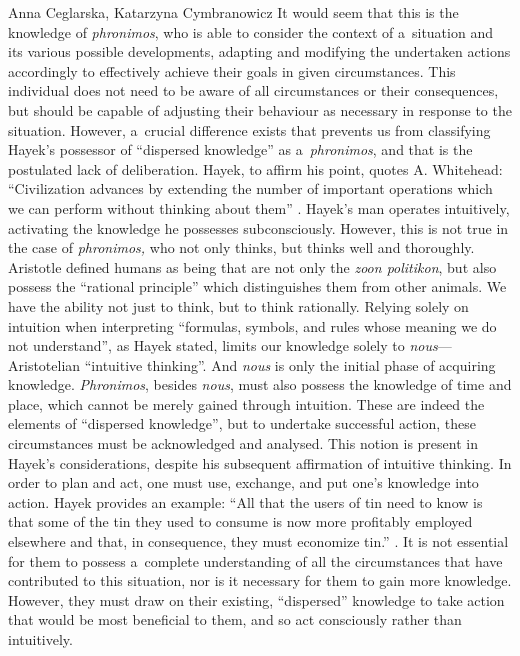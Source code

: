 \begin{artengenv2auth}{Anna Ceglarska, Katarzyna Cymbranowicz}
It would seem that this is the knowledge of \textit{phronimos}, who is able to consider the context of a~situation and its various possible developments, adapting and modifying the undertaken actions accordingly to effectively achieve their goals in given circumstances. This individual does not need to be aware of all circumstances or their consequences, but should be capable of adjusting their behaviour as necessary in response to the situation. However, a~crucial difference exists that prevents us from classifying Hayek's possessor of ``dispersed knowledge'' as a~\textit{phronimos}, and that is the postulated lack of deliberation. Hayek, to affirm his point, quotes A. Whitehead: ``Civilization advances by extending the number of important operations which we can perform without thinking about them'' 
\parencite[][p.528]{hayek_use_1945}. %
 Hayek's man operates intuitively, activating the knowledge he possesses subconsciously. However, this is not true in the case of \textit{phronimos,} who not only thinks, but thinks well and thoroughly. Aristotle defined humans as being that are not only the \textit{zoon politikon}, but also possess the ``rational principle'' 
\parencite[][]{rackham_nicomachean_1934} %
 which distinguishes them from other animals. We have the ability not just to think, but to think rationally. Relying solely on intuition when interpreting ``formulas, symbols, and rules whose meaning we do not understand'', as Hayek 
\parencite*[][p.528]{hayek_use_1945} %
 stated, limits our knowledge solely to \textit{nous}---Aristotelian ``intuitive thinking''. And \textit{nous} is only the initial phase of acquiring knowledge. \textit{Phronimos}, besides \textit{nous}, must also possess the knowledge of time and place, which cannot be merely gained through intuition. These are indeed the elements of ``dispersed knowledge'', but to undertake successful action, these circumstances must be acknowledged and analysed. This notion is present in Hayek's considerations, despite his subsequent affirmation of intuitive thinking. In order to plan and act, one must use, exchange, and put one's knowledge into action. Hayek provides an example: ``All that the users of tin need to know is that some of the tin they used to consume is now more profitably employed elsewhere and that, in consequence, they must economize tin.'' 
\parencite[][p.526]{hayek_use_1945}. %
 It is not essential for them to possess a~complete understanding of all the circumstances that have contributed to this situation, nor is it necessary for them to gain more knowledge. However, they must draw on their existing, ``dispersed'' knowledge to take action that would be most beneficial to them, and so act consciously rather than intuitively.




\end{artengenv2auth}
